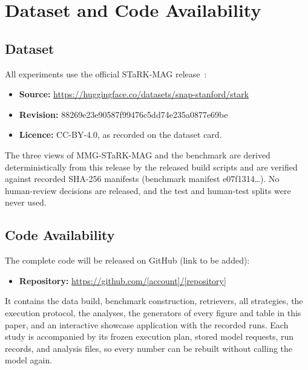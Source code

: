 \documentclass[conference]{IEEEtran}
\begin{document}
\section{Dataset and Code Availability}\label{sec:availability}

\subsection{Dataset}

All experiments use the official STaRK-MAG release~\cite{wu2024stark,wang2020mag}:

\begin{itemize}
\item \textbf{Source:} \url{https://huggingface.co/datasets/snap-stanford/stark}
\item \textbf{Revision:} 88269e23e90587f99476c5dd74e235a0877e69be
\item \textbf{Licence:} CC-BY-4.0, as recorded on the dataset card.
\end{itemize}

The three views of MMG-STaRK-MAG and the benchmark are derived deterministically from this release by the released build scripts and are verified against recorded SHA-256 manifests (benchmark manifest e07f1314\ldots{}). No human-review decisions are released, and the test and human-test splits were never used.

\subsection{Code Availability}

The complete code will be released on GitHub (link to be added):

\begin{itemize}
\item \textbf{Repository:} \url{https://github.com/[account]/[repository]}
\end{itemize}

It contains the data build, benchmark construction, retrievers, all strategies, the execution protocol, the analyses, the generators of every figure and table in this paper, and an interactive showcase application with the recorded runs. Each study is accompanied by its frozen execution plan, stored model requests, run records, and analysis files, so every number can be rebuilt without calling the model again.
\end{document}
